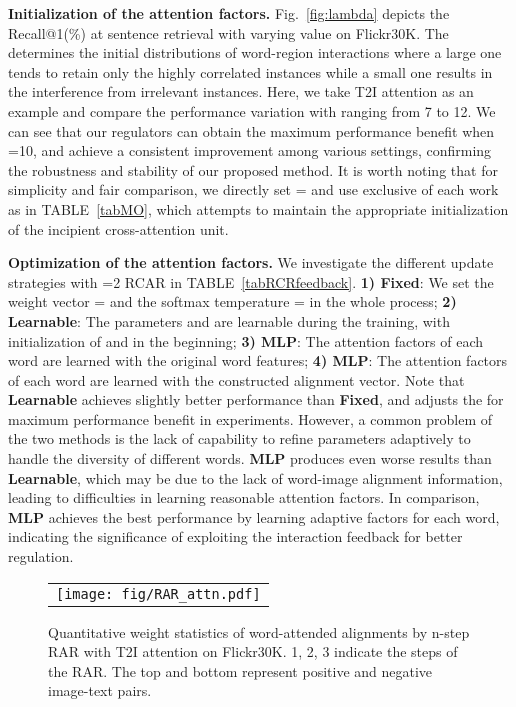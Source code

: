 \documentclass[journal]{IEEEtran}\newcommand{\ignore}[1]{}
\begin{document}
\textbf{Initialization of the attention factors.}
Fig.~\ref{fig:lambda} depicts the Recall@1(\%) at sentence retrieval with varying  value on Flickr30K. The  determines the initial distributions of word-region interactions where a large one tends to retain only the highly correlated instances while a small one results in the interference from irrelevant instances. Here, we take T2I attention as an example and compare the performance variation with  ranging from 7 to 12. We can see that our regulators can obtain the maximum performance benefit when =10, and achieve a consistent improvement among various settings, confirming the robustness and stability of our proposed method. It is worth noting that for simplicity and fair comparison, we directly set = and use exclusive  of each work as  in TABLE~\ref{tabMO}, which attempts to maintain the appropriate initialization of the incipient cross-attention unit.

\textbf{Optimization of the attention factors.} We investigate the different update strategies with =2 RCAR in TABLE~\ref{tabRCRfeedback}. \textbf{1) Fixed}: We set the weight vector = and the softmax temperature = in the whole process; \textbf{2) Learnable}: The parameters  and  are learnable during the training, with initialization of  and  in the beginning; \textbf{3) MLP}: The attention factors of each word are learned with the original word features; \textbf{4) MLP}: The attention factors of each word are learned with the constructed alignment vector. Note that \textbf{Learnable} achieves slightly better performance than \textbf{Fixed}, and adjusts the  for maximum performance benefit in experiments. However, a common problem of the two methods is the lack of capability to refine parameters adaptively to handle the diversity of different words.
\textbf{MLP} produces even worse results than \textbf{Learnable}, which may be due to the lack of word-image alignment information, leading to difficulties in learning reasonable attention factors. In comparison, \textbf{MLP} achieves the best performance by learning adaptive factors for each word, indicating the significance of exploiting the interaction feedback for better regulation.

\begin{figure}[t!]
	\centering
	\begin{tabular}{@{}c}
		\texttt{[image: fig/RAR\_attn.pdf]} 
	\end{tabular}
	\caption{Quantitative weight statistics of word-attended alignments by n-step RAR with T2I attention on Flickr30K. 1, 2, 3 indicate the steps of the RAR. The top and bottom represent positive and negative image-text pairs.}
	\label{fig:RARattn}
\end{figure}
\end{document}
